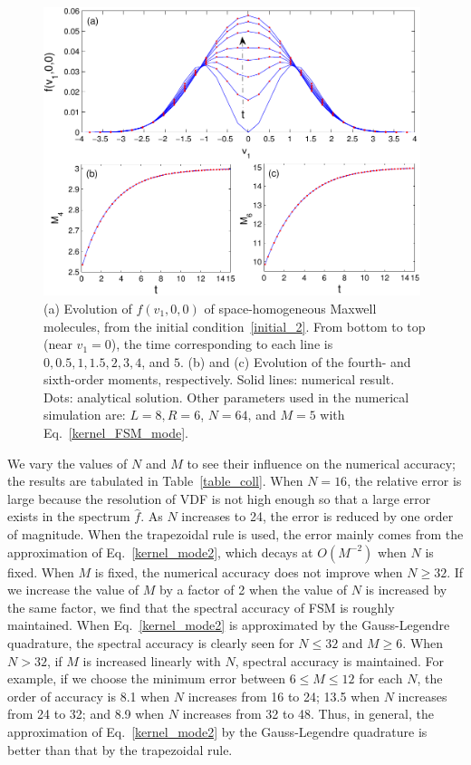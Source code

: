 \begin{figure}[t]
	\centering
	\includegraphics[width=11cm]{Chapter4/IMG/test11.pdf}
	\caption{
		(a) Evolution of $f(v_1,0,0)$ of space-homogeneous Maxwell molecules, from the initial condition~\eqref{initial_2}. From bottom to top (near $v_1=0$), the time corresponding to each line is $0, 0.5, 1, 1.5, 2, 3, 4$, and $5$. (b) and (c) Evolution of the fourth- and sixth-order moments, respectively. Solid lines: numerical result. Dots: analytical solution. Other parameters used in the numerical simulation are: $L=8, R=6$, $N=64$, and $M=5$ with Eq.~\eqref{kernel_FSM_mode}.  
	}
	\label{test2}
\end{figure}



We vary the values of $N$ and $M$ to see their influence on the numerical accuracy; the results are tabulated in Table~\ref{table_coll}. When $N=16$, the relative error is large because the resolution of VDF is not high enough so that a large error exists in the spectrum $\hat{f}$. As $N$ increases to 24, the error is reduced by one order of magnitude. When the trapezoidal rule is used, the error mainly comes from the approximation of Eq.~\eqref{kernel_mode2}, which decays at $O(M^{-2})$ when $N$ is fixed. When $M$ is fixed, the numerical accuracy does not improve when $N\ge32$. If we increase the value of $M$ by a factor of 2 when the value of $N$ is increased by the same factor, we find that the spectral accuracy of FSM is roughly maintained. When Eq.~\eqref{kernel_mode2} is approximated by the Gauss-Legendre quadrature, the spectral accuracy is clearly seen for $N\le32$ and $M\ge6$. When $N>32$, if $M$ is increased linearly with $N$, spectral accuracy is maintained. For example, if we choose the minimum error between $6\le{}M\le12$ for each $N$, the order of accuracy is 8.1 when $N$ increases from 16 to 24; 13.5 when $N$ increases from 24 to 32; and 8.9 when $N$ increases from 32 to 48.  Thus, in general, the approximation of Eq.~\eqref{kernel_mode2} by the Gauss-Legendre quadrature is better than that by the trapezoidal rule.




